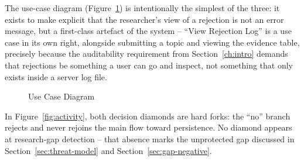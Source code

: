 \documentclass[12pt,a4paper]{report}
\begin{document}
The use-case diagram (Figure~\ref{fig:usecase}) is intentionally the simplest
of the three: it exists to make explicit that the researcher's view of a
rejection is not an error message, but a first-class artefact of the system
-- ``View Rejection Log'' is a use case in its own right, alongside submitting
a topic and viewing the evidence table, precisely because the auditability
requirement from Section~\ref{ch:intro} demands that rejections be
something a user can go and inspect, not something that only exists inside a
server log file.

\begin{figure}[H]
\centering
{}
\caption{Use Case Diagram}
\label{fig:usecase}
\end{figure}

In Figure~\ref{fig:activity}, both decision diamonds are hard forks: the
``no'' branch rejects and never rejoins the main flow toward persistence. No
diamond appears at research-gap detection -- that absence marks the
unprotected gap discussed in Section~\ref{sec:threat-model} and
Section~\ref{sec:gap-negative}.
\end{document}
